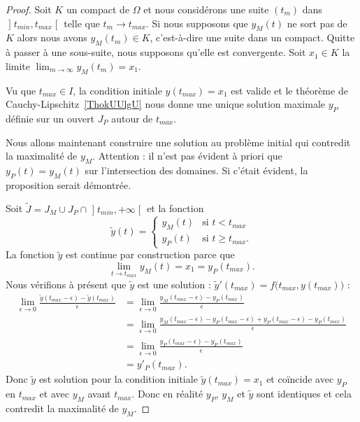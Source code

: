 \begin{proof}
Soit \( K\) un compact de \( \Omega\) et nous considérons une suite \( (t_m)\) dans \( \mathopen] t_{min} , t_{max} \mathclose[\) telle que \( t_m\to t_{max}\). Si nous supposons que \( y_M(t)\) ne sort pas de \( K\) alors nous avons \( y_M(t_m)\in K\), c'est-à-dire une suite dans un compact. Quitte à passer à une sous-suite, nous supposons qu'elle est convergente. Soit \( x_1\in K\) la limite \( \lim_{m\to \infty}y_M(t_m)=x_1\).

    Vu que \( t_{max}\in I\), la condition initiale \( y(t_{max})=x_1\) est valide et le théorème de Cauchy-Lipschitz~\ref{ThokUUlgU} nous donne une unique solution maximale \( y_P\) définie sur un ouvert \( J_P\) autour de \( t_{max}\).

    Nous allons maintenant construire une solution au problème initial qui contredit la maximalité de \( y_M\). Attention : il n'est pas évident à priori que \( y_P(t)=y_M(t)\) sur l'intersection des domaines. Si c'était évident, la proposition serait démontrée.

    Soit \( \tilde J=J_M\cup J_P\cap\mathopen] t_{min} , +\infty \mathclose[\) et la fonction
        \begin{equation}
            \tilde y(t)=\begin{cases}
                y_M(t)    &   \text{si } t<t_{max}\\
                y_P(t)    &    \text{si } t\geq t_{max}.
            \end{cases}
        \end{equation}
        La fonction \( \tilde y\) est continue par construction parce que
        \begin{equation}
            \lim_{t\to t_{max}} y_M(t)=x_1=y_P(t_{max}).
        \end{equation}
        Nous vérifions à présent que \( \tilde y\) est une solution : \( \tilde y'(t_{max})=f\big( t_{max},y(t_{max}) \big)\) :
        \begin{subequations}
            \begin{align}
                \lim_{\epsilon\to 0}\frac{ \tilde y(t_{max}-\epsilon)-\tilde y(t_{max}) }{ \epsilon }&=\lim_{\epsilon\to 0}\frac{ y_M(t_{max}-\epsilon)-y_P(t_{max}) }{ \epsilon }\\
                &=\lim_{\epsilon\to 0}\frac{ y_M(t_{max}-\epsilon)-y_P(t_{max}-\epsilon)+y_P(t_{max}-\epsilon)-y_P(t_{max}) }{ \epsilon }\\
                &=\lim_{\epsilon\to 0}\frac{ y_P(t_{max}-\epsilon)-y_P(t_{max}) }{ \epsilon }\\
                &=y'_P(t_{max}).
            \end{align}
        \end{subequations}
        Donc \( \tilde y\) est solution pour la condition initiale \( \tilde y(t_{max})=x_1\) et coïncide avec \( y_P\) en \( t_{max}\) et avec \( y_M\) avant \( t_{max}\). Donc en réalité \( y_P\), \( y_M\) et \( \tilde y\) sont identiques et cela contredit la maximalité de \( y_M\).
\end{proof}

